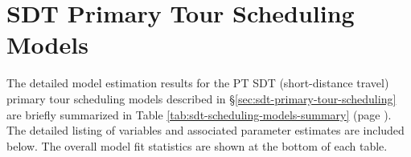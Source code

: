 \chapter{SDT Primary Tour Scheduling Models}\label{app:sdt-primary-tour-scheduling}

The detailed model estimation results for the PT SDT (short-distance travel) primary tour scheduling models described in \S\ref{sec:sdt-primary-tour-scheduling} are briefly summarized in Table \ref{tab:sdt-scheduling-models-summary} (page \pageref{tab:sdt-scheduling-models-summary}). The detailed listing of variables and associated parameter estimates are included below. The overall model fit statistics are shown at the bottom of each table. 

